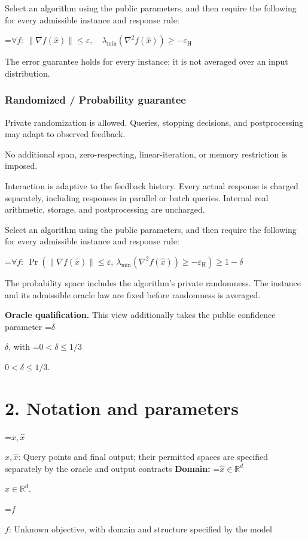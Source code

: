 \documentclass[10pt,a4paper]{article}
\newcommand{\AtlasMath}[1]{\par\begingroup\centering\setbox0=\hbox{$\displaystyle #1$}\ifdim\wd0>1.4\linewidth\typeout{ATLAS WIDE FORMULA: \the\wd0}\fi\ifdim\wd0>\linewidth\resizebox{\linewidth}{!}{\box0}\else\box0\fi\par\endgroup}
\newcommand{\AtlasInlineMath}[1]{\begingroup\setbox0=\hbox{$#1$}\ifdim\wd0>.4\linewidth\endgroup\AtlasMath{#1}\else\endgroup$#1$\fi}
\begin{document}
Select an algorithm using the public parameters, and then require the following for every admissible instance and response rule:


\AtlasMath{\forall f:\ \|\nabla f(\widehat{x})\|\le\varepsilon,\quad\lambda_{\min}(\nabla^2 f(\widehat{x}))\ge-\varepsilon_{\mathrm{H}}}


The error guarantee holds for every instance; it is not averaged over an input distribution.

\subsubsection{Randomized / Probability guarantee}
Private randomization is allowed. Queries, stopping decisions, and postprocessing may adapt to observed feedback.

No additional span, zero-respecting, linear-iteration, or memory restriction is imposed.

Interaction is adaptive to the feedback history. Every actual response is charged separately, including responses in parallel or batch queries. Internal real arithmetic, storage, and postprocessing are uncharged.

Select an algorithm using the public parameters, and then require the following for every admissible instance and response rule:


\AtlasMath{\forall f:\ \Pr(\|\nabla f(\widehat{x})\|\le\varepsilon,\ \lambda_{\min}(\nabla^2 f(\widehat{x}))\ge-\varepsilon_{\mathrm{H}})\ge1-\delta}


The probability space includes the algorithm's private randomness. The instance and its admissible oracle law are fixed before randomness is averaged.

\textbf{Oracle qualification.} This view additionally takes the public confidence parameter \AtlasInlineMath{\delta}, with \AtlasInlineMath{0<\delta\le1/3}.

\section{2. Notation and parameters}
\AtlasInlineMath{x,\widehat{x}}: Query points and final output; their permitted spaces are specified separately by the oracle and output contracts \textbf{Domain:} \AtlasInlineMath{\widehat{x}\in \mathbb{R}^d}.

\AtlasInlineMath{f}: Unknown objective, with domain and structure specified by the model
\end{document}
